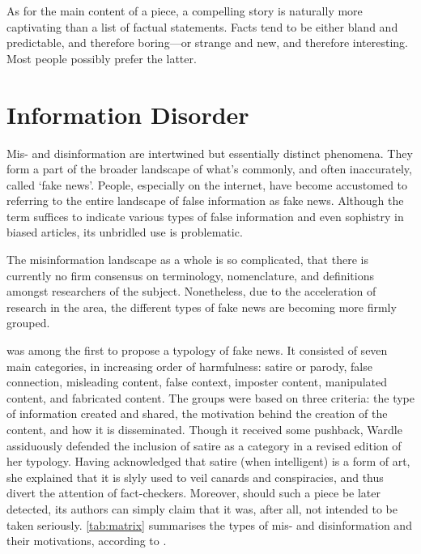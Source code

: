 As for the main content of a piece, a compelling story is naturally more captivating than a list of factual statements. Facts tend to be either bland and predictable, and therefore boring—or strange and new, and therefore interesting. Most people possibly prefer the latter.

\section{Information Disorder}
\label{sec:1-infodis}

Mis- and disinformation are intertwined but essentially distinct phenomena. They form a part of the broader landscape of what's commonly, and often inaccurately, called `fake news'. People, especially on the internet, have become accustomed to referring to the entire landscape of false information as fake news. Although the term suffices to indicate various types of false information and even sophistry in biased articles, its unbridled use is problematic.

The misinformation landscape as a whole is so complicated, that there is currently no firm consensus on terminology, nomenclature, and definitions amongst researchers of the subject. Nonetheless, due to the acceleration of research in the area, the different types of fake news are becoming more firmly grouped.

  was among the first to propose a typology of fake news. It consisted of seven main categories, in increasing order of harmfulness: satire or parody, false connection, misleading content, false context, imposter content, manipulated content, and fabricated content. The groups were based on three criteria: the type of information created and shared, the motivation behind the creation of the content, and how it is disseminated. Though it received some pushback, Wardle assiduously defended the inclusion of satire as a category in a revised edition of her typology. Having acknowledged that satire (when intelligent) is a form of art, she explained that it is slyly used to veil canards and conspiracies, and thus divert the attention of fact-checkers. Moreover, should such a piece be later detected, its authors can simply claim that it was, after all, not intended to be taken seriously. \autoref{tab:matrix} summarises the types of mis- and disinformation and their motivations, according to .

